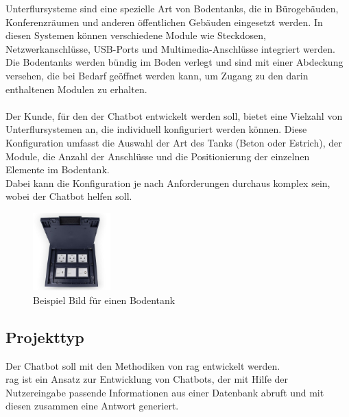 Unterflursysteme sind eine spezielle Art von Bodentanks, die in Bürogebäuden, Konferenzräumen und anderen öffentlichen Gebäuden eingesetzt werden.  
In diesen Systemen können verschiedene Module wie Steckdosen, Netzwerkanschlüsse, USB-Ports und Multimedia-Anschlüsse integriert werden.\\  
Die Bodentanks werden bündig im Boden verlegt und sind mit einer Abdeckung versehen, die bei Bedarf geöffnet werden kann, um Zugang zu den darin enthaltenen Modulen zu erhalten.\\\\  
Der Kunde, für den der Chatbot entwickelt werden soll, bietet eine Vielzahl von Unterflursystemen an, die individuell konfiguriert werden können.  
Diese Konfiguration umfasst die Auswahl der Art des Tanks (Beton oder Estrich), der Module, die Anzahl der Anschlüsse und die Positionierung der einzelnen Elemente im Bodentank.\\  
Dabei kann die Konfiguration je nach Anforderungen durchaus komplex sein, wobei der Chatbot helfen soll.

\begin{figure}[H]
    \begin{center}
        \includegraphics[width=3cm]{bilder/bodentank.jpeg}
        \caption{Beispiel Bild für einen Bodentank}\label{fig:bodentank}
    \end{center}
\end{figure}

\pagebreak
\subsection{Projekttyp}\label{sec:proj_typ}
Der Chatbot soll mit den Methodiken von \gls{rag} entwickelt werden.\\  
\gls{rag} ist ein Ansatz zur Entwicklung von Chatbots, der mit Hilfe der Nutzereingabe  
passende Informationen aus einer Datenbank abruft und mit diesen zusammen eine Antwort generiert.

